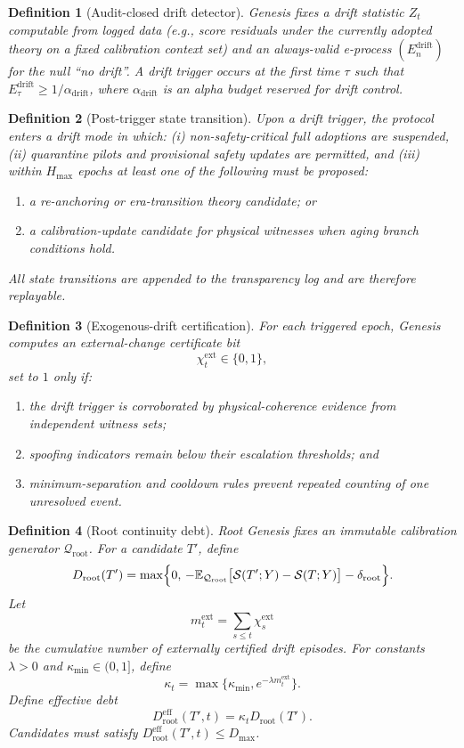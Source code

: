 \documentclass[11pt,a4paper]{article}
\newtheorem{definition}{Definition}[section]
\begin{document}
\begin{definition}[Audit-closed drift detector]
Genesis fixes a drift statistic $Z_t$ computable from logged data (e.g., score residuals under the currently adopted theory on a fixed calibration context set) and an always-valid e-process $(E^{\mathrm{drift}}_n)$ for the null ``no drift''.
A drift trigger occurs at the first time $\tau$ such that $E^{\mathrm{drift}}_\tau \ge 1/\alpha_{\mathrm{drift}}$, where $\alpha_{\mathrm{drift}}$ is an alpha budget reserved for drift control.
\end{definition}

\begin{definition}[Post-trigger state transition]
Upon a drift trigger, the protocol enters a \emph{drift mode} in which:
(i) non-safety-critical full adoptions are suspended,
(ii) quarantine pilots and provisional safety updates are permitted,
and (iii) within $H_{\max}$ epochs at least one of the following must be proposed:
\begin{enumerate}[leftmargin=*]
\item a re-anchoring or era-transition theory candidate; or
\item a calibration-update candidate for physical witnesses when aging branch conditions hold.
\end{enumerate}
All state transitions are appended to the transparency log and are therefore replayable.
\end{definition}

\begin{definition}[Exogenous-drift certification]
For each triggered epoch, Genesis computes an external-change certificate bit
\[
\chi_t^{\mathrm{ext}}\in\{0,1\},
\]
set to $1$ only if:
\begin{enumerate}[leftmargin=*]
\item the drift trigger is corroborated by physical-coherence evidence from independent witness sets;
\item spoofing indicators remain below their escalation thresholds; and
\item minimum-separation and cooldown rules prevent repeated counting of one unresolved event.
\end{enumerate}
\end{definition}

\begin{definition}[Root continuity debt]
Root Genesis fixes an immutable calibration generator $\mathcal{Q}_{\mathrm{root}}$.
For a candidate $T'$, define
\[
D_{\mathrm{root}}(T')=\max\Bigl\{0,\,-\mathbb{E}_{\mathcal{Q}_{\mathrm{root}}}\big[\mathcal{S}(T';Y)-\mathcal{S}(T;Y)\big]-\delta_{\mathrm{root}}\Bigr\}.
\]
Let
\[
m_t^{\mathrm{ext}}=\sum_{s\le t}\chi_s^{\mathrm{ext}}
\]
be the cumulative number of \emph{externally certified} drift episodes.
For constants $\lambda>0$ and $\kappa_{\min}\in(0,1]$, define
\[
\kappa_t=\max\{\kappa_{\min},e^{-\lambda m_t^{\mathrm{ext}}}\}.
\]
Define effective debt
\[
D_{\mathrm{root}}^{\mathrm{eff}}(T',t)=\kappa_t D_{\mathrm{root}}(T').
\]
Candidates must satisfy $D_{\mathrm{root}}^{\mathrm{eff}}(T',t)\le D_{\max}$.
\end{definition}
\end{document}
